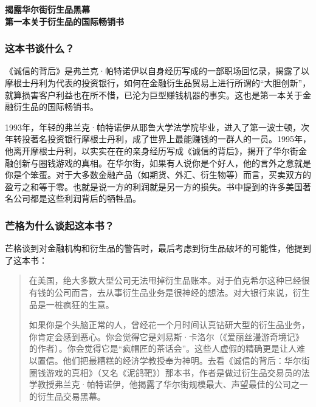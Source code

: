 \cleardoublepage
{}


\begin{BookSummaryBox}
{\centering \textbf{揭露华尔街衍生品黑幕\\ 第一本关于衍生品的国际畅销书}\par}
\end{BookSummaryBox}

\subsubsection*{这本书谈什么？}

《诚信的背后》是弗兰克·帕特诺伊以自身经历写成的一部职场回忆录，揭露了以摩根士丹利为代表的投资银行，如何在金融衍生品贸易上进行所谓的“大胆创新”，就算损害客户利益也在所不惜，已沦为巨型赚钱机器的事实。这也是第一本关于金融衍生品的国际畅销书。
\par

1993年，年轻的弗兰克·帕特诺伊从耶鲁大学法学院毕业，进入了第一波士顿，次年转投著名投资银行摩根士丹利，成了世界上最能赚钱的一群人的一员。1995年，他离开摩根士丹利，以实实在在的亲身经历写成《诚信的背后》，揭开了华尔街金融创新与圈钱游戏的真相。在华尔街，如果有人说你是个好人，他的言外之意就是你是个笨蛋。对于大多数金融产品（如期货、外汇、衍生物等）而言，买卖双方的盈亏之和等于零。也就是说一方的利润就是另一方的损失。书中提到的许多美国著名公司都是这些利润背后的牺牲品。
\par

\subsubsection*{芒格为什么谈起这本书？}

芒格谈到对金融机构和衍生品的警告时，最后考虑到衍生品破坏的可能性，他提到了这本书：
\par

\begin{quotation}
在美国，绝大多数大型公司无法甩掉衍生品账本。对于伯克希尔这种已经很有钱的公司而言，去从事衍生品业务是很神经的想法。对大银行来说，衍生品是一桩疯狂的生意。
\par

如果你是个头脑正常的人，曾经花一个月时间认真钻研大型的衍生品业务，你肯定会感到恶心。你会觉得它是刘易斯·卡洛尔（《爱丽丝漫游奇境记》的作者）。你会觉得它是“疯帽匠的茶话会”。这些人虚假的精确更是让人难以置信。他们把最糟糕的经济学教授奉为神明。去看《诚信的背后：华尔街圈钱游戏的真相》（又名《泥鸽靶》）那本书，作者是做过衍生品交易员的法学教授弗兰克·帕特诺伊，他揭露了华尔街规模最大、声望最佳的公司之一的衍生品交易黑幕。
\par
\end{quotation}

